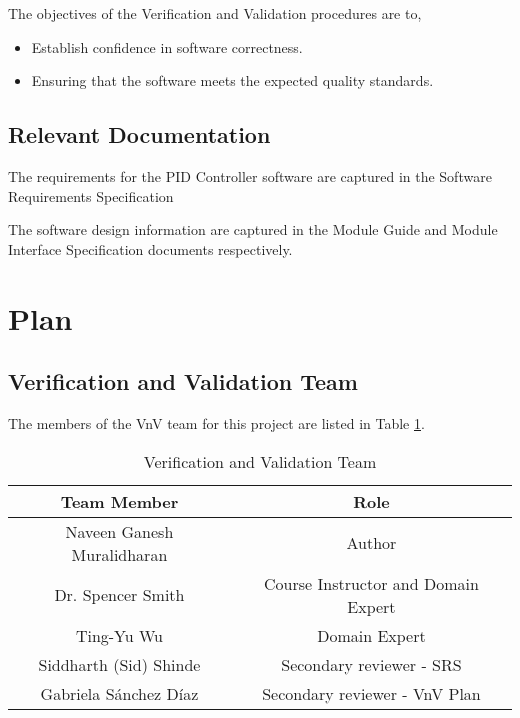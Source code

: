 \documentclass[12pt, titlepage]{article}
\begin{document}
The objectives of the Verification and Validation procedures are to,

\begin{itemize}
\item Establish confidence in software correctness.
\item Ensuring that the software meets the expected quality standards.
\end{itemize}

\subsection{Relevant Documentation}


The requirements for the PID Controller software are captured in the Software
Requirements Specification \cite{SRS}

The software design information are captured in the Module Guide  \cite{MG}
and Module Interface Specification \cite{MIS} documents respectively.

\section{Plan}
	
\subsection{Verification and Validation Team}


The members of the VnV team for this project are listed in Table \ref{tab:VnVTeam}.

\begin{table}[]
\begin{tabular}{cc}
\hline
\multicolumn{1}{c|}{Team   Member} & Role \\ \hline
Naveen Ganesh Muralidharan      & Author    \\
Dr. Spencer Smith                     & Course Instructor and Domain Expert    \\
Ting-Yu Wu                               & Domain Expert    \\
Siddharth (Sid) Shinde               & Secondary reviewer - SRS    \\
Gabriela Sánchez Díaz	               & Secondary reviewer - VnV Plan \\   
\end{tabular}
\caption{Verification and Validation Team}
\label{tab:VnVTeam}
\end{table}
\end{document}
